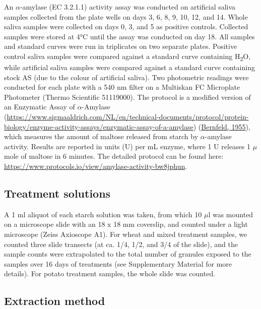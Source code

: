 \documentclass[
  b5paper,
]{book}
\begin{document}
An \(\alpha\)-amylase (EC 3.2.1.1) activity assay was conducted on
artificial saliva samples collected from the plate wells on days 3, 6,
8, 9, 10, 12, and 14. Whole saliva samples were collected on days 0, 3,
and 5 as positive controls. Collected samples were stored at 4°C until
the assay was conducted on day 18. All samples and standard curves were
run in triplicates on two separate plates. Positive control saliva
samples were compared against a standard curve containing
H\textsubscript{2}O, while artificial saliva samples were compared
against a standard curve containing stock AS (due to the colour of
artificial saliva). Two photometric readings were conducted for each
plate with a 540 nm filter on a Multiskan FC Microplate Photometer
(Thermo Scientific 51119000). The protocol is a modified version of an
Enzymatic Assay of \(\alpha\)-Amylase
(\url{https://www.sigmaaldrich.com/NL/en/technical-documents/protocol/protein-biology/enzyme-activity-assays/enzymatic-assay-of-a-amylase})
(\protect\hyperlink{ref-bernfeldAmylase1955}{Bernfeld, 1955}), which
measures the amount of maltose released from starch by
\(\alpha\)-amylase activity. Results are reported in units (U) per mL
enzyme, where 1 U releases 1 \(\mu\)mole of maltose in 6 minutes. The
detailed protocol can be found here:
\url{https://www.protocols.io/view/amylase-activity-bw8jphun}.

\hypertarget{treatment-solutions}{%
\subsection{Treatment solutions}\label{treatment-solutions}}

A 1 ml aliquot of each starch solution was taken, from which 10 \(\mu\)l
was mounted on a microscope slide with an 18 x 18 mm coverslip, and
counted under a light microscope (Zeiss Axioscope A1). For wheat and
mixed treatment samples, we counted three slide transects (at ca. 1/4,
1/2, and 3/4 of the slide), and the sample counts were extrapolated to
the total number of granules exposed to the samples over 16 days of
treatments (see Supplementary Material for more details). For potato
treatment samples, the whole slide was counted.

\hypertarget{extraction-method}{%
\subsection{Extraction method}\label{extraction-method}}
\end{document}
